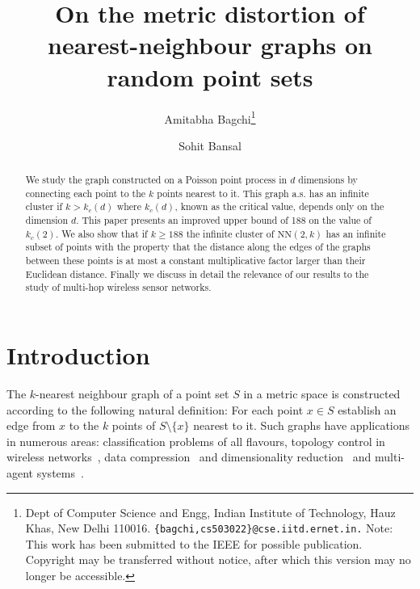 \documentclass[11pt]{article}
\def\NN{\mbox{NN}}
\begin{document}
\title{On the metric distortion of nearest-neighbour graphs on random point sets} 

\author{
 Amitabha Bagchi\thanks{Dept of Computer Science and Engg, Indian Institute of Technology, Hauz Khas, New Delhi 110016. {\tt \{bagchi,cs503022\}@cse.iitd.ernet.in.} Note: This work has been submitted to the IEEE for possible
publication. Copyright may be transferred without notice, after
which this version may no longer be accessible.
}
\and Sohit Bansal\footnotemark[1] 
}
\maketitle 



\begin{abstract}
We study the graph constructed on a Poisson point process in $d$
dimensions by connecting each point to the $k$ points nearest to
it. This graph a.s. has an infinite cluster if $k > k_c(d)$ where
$k_c(d)$, known as the critical value, depends only on the dimension
$d$. This paper presents an improved upper bound of 188 on the value
of $k_c(2)$. We also show that if $k \geq 188$ the infinite cluster of
$\NN(2,k)$ has an infinite subset of points with the property that the
distance along the edges of the graphs between these points is at most
a constant multiplicative factor larger than their Euclidean
distance. Finally we discuss in detail the relevance of our results to
the study of multi-hop wireless sensor networks.
\end{abstract}



\section{Introduction} 
\label{sec:intro}

The $k$-nearest neighbour graph of a point set $S$ in a metric space
is constructed according to the following natural definition: For each
point $x \in S$ establish an edge from $x$ to the $k$ points of $S
\setminus \{x\}$ nearest to it. Such graphs have applications in
numerous areas: classification problems of all flavours, topology
control in wireless networks~\cite{blough-mobihoc:2003,xue-wn:2004},
data compression~\cite{ouyang-wise:2002,adler-dcc:2001} and
dimensionality reduction~\cite{tenenbaum-science:2000} and multi-agent
systems~\cite{goebels-icnc:2006}.
\end{document}

